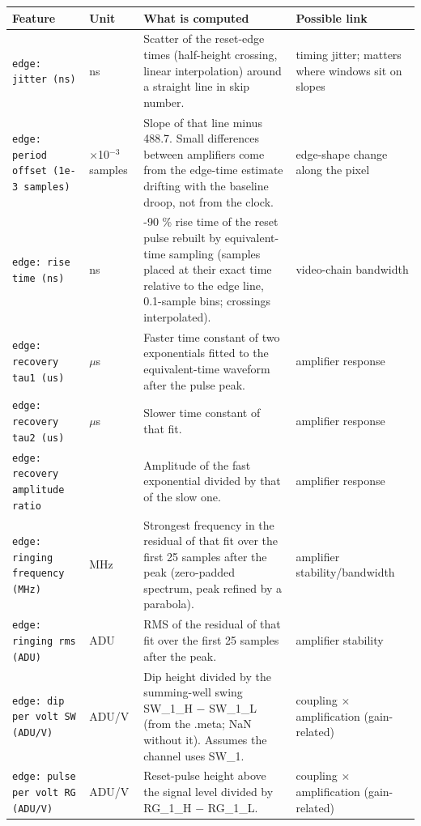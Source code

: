 \documentclass[10pt]{article}
\begin{document}
\begin{longtable}{>{\raggedright\arraybackslash}p{}>{\raggedright\arraybackslash}p{}>{\raggedright\arraybackslash}p{}>{\raggedright\arraybackslash}p{}}
\toprule Feature & Unit & What is computed & Possible link \\ \midrule \endhead
\bottomrule \endfoot
\texttt{edge: jitter (ns)} & ns & Scatter of the reset-edge times (half-height crossing, linear interpolation) around a straight line in skip number. & timing jitter; matters where windows sit on slopes \\
\texttt{edge: period offset (1e-3 samples)} & $\times$10$^{-3}$ samples & Slope of that line minus 488.7. Small differences between amplifiers come from the edge-time estimate drifting with the baseline droop, not from the clock. & edge-shape change along the pixel \\
\texttt{edge: rise time (ns)} & ns & 10-90 \% rise time of the reset pulse rebuilt by equivalent-time sampling (samples placed at their exact time relative to the edge line, 0.1-sample bins; crossings interpolated). & video-chain bandwidth \\
\texttt{edge: recovery tau1 (us)} & $\mu$s & Faster time constant of two exponentials fitted to the equivalent-time waveform after the pulse peak. & amplifier response \\
\texttt{edge: recovery tau2 (us)} & $\mu$s & Slower time constant of that fit. & amplifier response \\
\texttt{edge: recovery amplitude ratio} &  & Amplitude of the fast exponential divided by that of the slow one. & amplifier response \\
\texttt{edge: ringing frequency (MHz)} & MHz & Strongest frequency in the residual of that fit over the first 25 samples after the peak (zero-padded spectrum, peak refined by a parabola). & amplifier stability/bandwidth \\
\texttt{edge: ringing rms (ADU)} & ADU & RMS of the residual of that fit over the first 25 samples after the peak. & amplifier stability \\
\texttt{edge: dip per volt SW (ADU/V)} & ADU/V & Dip height divided by the summing-well swing SW\_1\_H $-$ SW\_1\_L (from the .meta; NaN without it). Assumes the channel uses SW\_1. & coupling $\times$ amplification (gain-related) \\
\texttt{edge: pulse per volt RG (ADU/V)} & ADU/V & Reset-pulse height above the signal level divided by RG\_1\_H $-$ RG\_1\_L. & coupling $\times$ amplification (gain-related) \\

\end{longtable}
\end{document}
